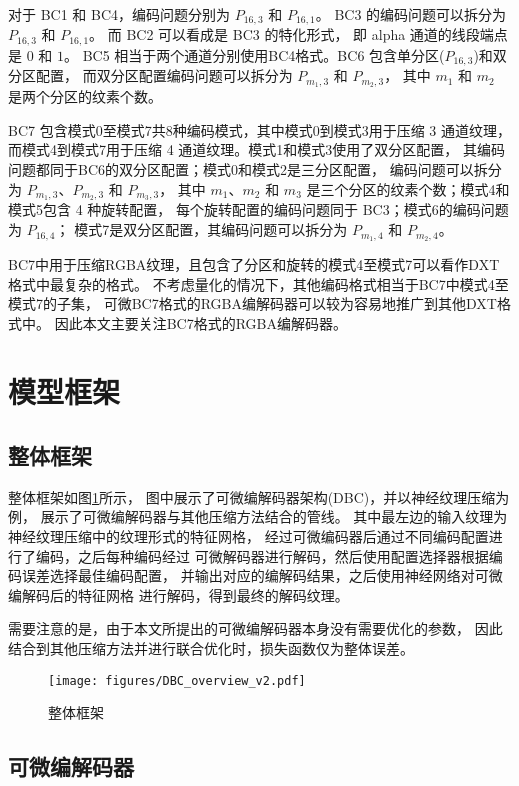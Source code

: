 对于 BC1 和 BC4，编码问题分别为 $P_{16,3}$ 和 $P_{16,1}$。
BC3 的编码问题可以拆分为 $P_{16,3}$ 和 $P_{16,1}$。
而 BC2 可以看成是 BC3 的特化形式，
即 alpha 通道的线段端点是 $0$ 和 $1$。
BC5 相当于两个通道分别使用BC4格式。BC6 包含单分区($P_{16,3}$)和双分区配置，
而双分区配置编码问题可以拆分为 $P_{m_1,3}$ 和 $P_{m_2,3}$，
其中 $m_1$ 和 $m_2$ 是两个分区的纹素个数。

BC7 包含模式0至模式7共8种编码模式，其中模式0到模式3用于压缩 3 通道纹理，
而模式4到模式7用于压缩 4 通道纹理。模式1和模式3使用了双分区配置，
其编码问题都同于BC6的双分区配置；模式0和模式2是三分区配置，
编码问题可以拆分为 $P_{m_1,3}$、$P_{m_2,3}$ 和 $P_{m_3,3}$，
其中 $m_1$、$m_2$ 和 $m_3$ 是三个分区的纹素个数；模式4和模式5包含 4 种旋转配置，
每个旋转配置的编码问题同于 BC3；模式6的编码问题为 $P_{16,4}$；
模式7是双分区配置，其编码问题可以拆分为  $P_{m_1,4}$ 和 $P_{m_2,4}$。

BC7中用于压缩RGBA纹理，且包含了分区和旋转的模式4至模式7可以看作DXT格式中最复杂的格式。
不考虑量化的情况下，其他编码格式相当于BC7中模式4至模式7的子集，
可微BC7格式的RGBA编解码器可以较为容易地推广到其他DXT格式中。
因此本文主要关注BC7格式的RGBA编解码器。

\section{模型框架}

\subsection{整体框架}

整体框架如图\ref{fig:DBC_overview}所示，
图中展示了可微编解码器架构(DBC)，并以神经纹理压缩为例，
展示了可微编解码器与其他压缩方法结合的管线。
其中最左边的输入纹理为神经纹理压缩中的纹理形式的特征网格，
经过可微编码器后通过不同编码配置进行了编码，之后每种编码经过
可微解码器进行解码，然后使用配置选择器根据编码误差选择最佳编码配置，
并输出对应的编解码结果，之后使用神经网络对可微编解码后的特征网格
进行解码，得到最终的解码纹理。

需要注意的是，由于本文所提出的可微编解码器本身没有需要优化的参数，
因此结合到其他压缩方法并进行联合优化时，损失函数仅为整体误差。

\begin{figure}[htbp]
    \centering
    \texttt{[image: figures/DBC\_overview\_v2.pdf]}
    \caption{整体框架}
    \label{fig:DBC_overview}
\end{figure}


\subsection{可微编解码器}

